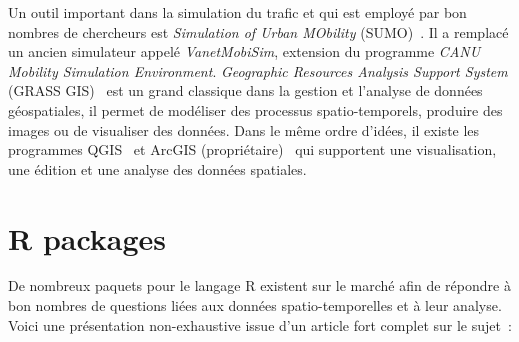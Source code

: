 Un outil important dans la simulation du trafic et qui est employé par bon nombres de chercheurs est \textit{Simulation of Urban MObility} (SUMO)~\cite{SUMO2012}. Il a remplacé un ancien simulateur appelé \textit{VanetMobiSim}, extension du programme \textit{CANU Mobility Simulation Environment}. \textit{Geographic Resources Analysis Support System} (GRASS GIS)~\cite{GRASS_GIS_software} est un grand classique dans la gestion et l'analyse de données géospatiales, il permet de modéliser des processus spatio-temporels, produire des images ou de visualiser des données. Dans le même ordre d'idées, il existe les programmes QGIS~\cite{QGIS_software} et ArcGIS (propriétaire)~\cite{ArcGIS_software} qui supportent une visualisation, une édition et une analyse des données spatiales.


        

\section{R packages}


De nombreux paquets pour le langage R existent sur le marché afin de répondre à bon nombres de questions liées aux données spatio-temporelles et à leur analyse. Voici une présentation non-exhaustive issue d'un article fort complet sur le sujet~\cite{pebesma2015software}:

